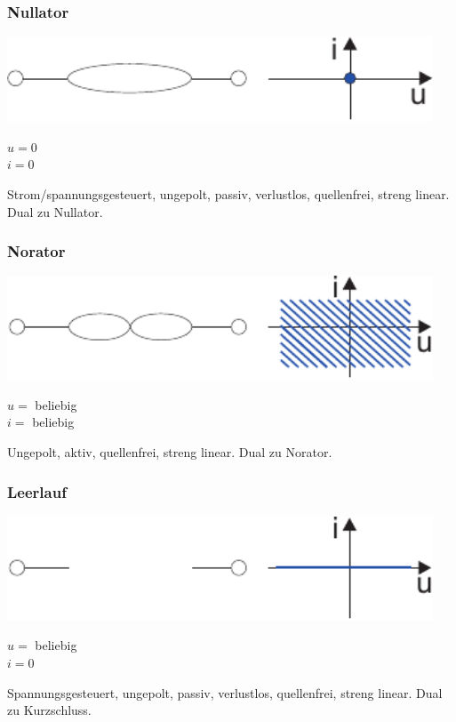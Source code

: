\documentclass[a4paper,twocolumn,10pt]{article}
\begin{document}
\subsubsection*{Nullator}
\begin{minipage}[b]{0.26\textwidth}
\includegraphics[width=0.95\textwidth]{img/Nullator}
\end{minipage}
\hfill
\begin{minipage}[b]{0.2\textwidth}
$u=0$\\
$i=0$
\end{minipage}
Strom/spannungsgesteuert, ungepolt, passiv, verlustlos, quellenfrei, streng linear. Dual zu Nullator.

\subsubsection*{Norator}
\begin{minipage}[b]{0.26\textwidth}
\includegraphics[width=0.95\textwidth]{img/Norator}
\end{minipage}
\hfill
\begin{minipage}[b]{0.2\textwidth}
$u=$ beliebig\\
$i=$ beliebig
\end{minipage}
Ungepolt, aktiv, quellenfrei, streng linear. Dual zu Norator.

\subsubsection*{Leerlauf}
\begin{minipage}[b]{0.26\textwidth}
\includegraphics[width=0.95\textwidth]{img/Leerlauf}
\end{minipage}
\hfill
\begin{minipage}[b]{0.2\textwidth}
$u=$ beliebig\\
$i=0$
\end{minipage}
Spannungsgesteuert, ungepolt, passiv, verlustlos, quellenfrei, streng linear. Dual zu Kurzschluss.
\end{document}
